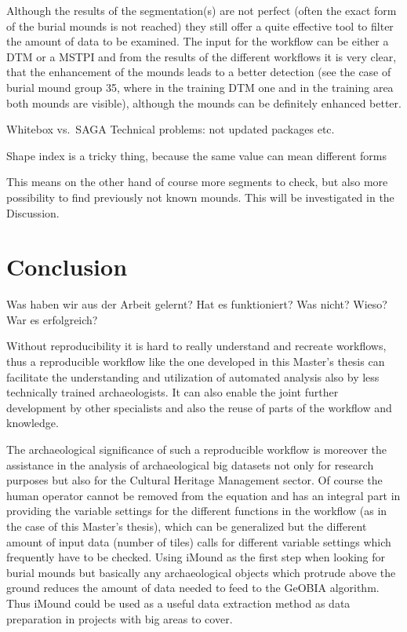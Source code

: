 \documentclass[
]{article}
\begin{document}
Although the results of the segmentation(s) are not perfect (often the exact form of the burial mounds is not reached) they still offer a quite effective tool to filter the amount of data to be examined. The input for the workflow can be either a DTM or a MSTPI and from the results of the different workflows it is very clear, that the enhancement of the mounds leads to a better detection (see the case of burial mound group 35, where in the training DTM one and in the training area both mounds are visible), although the mounds can be definitely enhanced better.

Whitebox vs.~SAGA
Technical problems: not updated packages etc.

Shape index is a tricky thing, because the same value can mean different forms

This means on the other hand of course more segments to check, but also more possibility to find previously not known mounds. This will be investigated in the Discussion.

\newpage

\hypertarget{conclusion}{%
\section{Conclusion}\label{conclusion}}

Was haben wir aus der Arbeit gelernt? Hat es funktioniert? Was nicht? Wieso? War es erfolgreich?

Without reproducibility it is hard to really understand and recreate workflows, thus a reproducible workflow like the one developed in this Master's thesis can facilitate the understanding and utilization of automated analysis also by less technically trained archaeologists. It can also enable the joint further development by other specialists and also the reuse of parts of the workflow and knowledge.

The archaeological significance of such a reproducible workflow is moreover the assistance in the analysis of archaeological big datasets not only for research purposes but also for the Cultural Heritage Management sector. Of course the human operator cannot be removed from the equation and has an integral part in providing the variable settings for the different functions in the workflow (as in the case of this Master's thesis), which can be generalized but the different amount of input data (number of tiles) calls for different variable settings which frequently have to be checked.
Using iMound as the first step when looking for burial mounds but basically any archaeological objects which protrude above the ground reduces the amount of data needed to feed to the GeOBIA algorithm. Thus iMound could be used as a useful data extraction method as data preparation in projects with big areas to cover.
\end{document}
